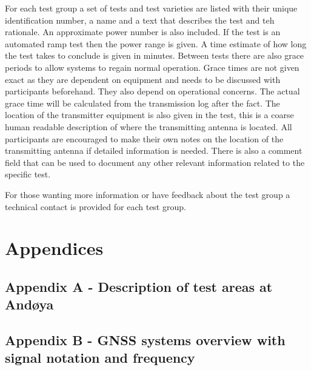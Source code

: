 \documentclass[a4paper]{book}
\begin{document}
For each test group a set of tests and test varieties are listed with their unique identification number, a name and a text that describes the test and teh rationale. An approximate power number is also included. If the test is an automated ramp test then the power range is given. A time estimate of how long the test takes to conclude is given in minutes. Between tests there are also grace periods to allow systems to regain normal operation. Grace  times are not given exact as they are dependent on equipment and needs to be discussed with participants beforehand. They also depend on operational concerns. The actual grace time will be calculated from the transmission log after the fact. The location of the transmitter equipment is also given in the test, this is a coarse human readable description of where the transmitting antenna is located. All participants are encouraged to make their own notes on the location of the transmitting antenna if detailed information is needed. There is also a comment field that can be used to document any other relevant information related to the specific test. \newline

For those wanting more information or have feedback about the test group a technical contact is provided for each test group. 



\chapter{Appendices}
\section{Appendix A - Description of test areas at Andøya}


\section{Appendix B - GNSS systems overview with signal notation and frequency}

\end{document}
